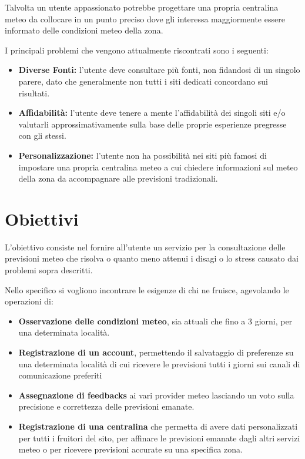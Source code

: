 \par Talvolta un utente appassionato potrebbe progettare una propria centralina meteo da collocare in un punto preciso dove gli interessa maggiormente essere informato delle condizioni meteo della zona.

\par I principali problemi che vengono attualmente riscontrati sono i seguenti:
\begin{itemize}

    \item \textbf{Diverse Fonti:} l'utente deve consultare più fonti, non fidandosi di un singolo parere, dato che generalmente non tutti i siti dedicati concordano sui risultati.
    
    \item \textbf{Affidabilità:} l'utente deve tenere a mente l'affidabilità dei singoli siti e/o valutarli approssimativamente sulla base delle proprie esperienze pregresse con gli stessi.
    
    \item \textbf{Personalizzazione:} l'utente non ha possibilità nei siti più famosi di impostare una propria centralina meteo a cui chiedere informazioni sul meteo della zona da accompagnare alle previsioni tradizionali.
    
\end{itemize}
 
\section{Obiettivi}
L'obiettivo consiste nel fornire all'utente un servizio per la consultazione delle previsioni meteo che risolva o quanto meno attenui i disagi o lo stress causato dai problemi sopra descritti. 

\par Nello specifico si vogliono incontrare le esigenze di chi ne fruisce, agevolando le operazioni di:
\begin{itemize}
    \item \textbf{Osservazione delle condizioni meteo}, sia attuali che fino a 3 giorni, per una determinata località.
    \item \textbf{Registrazione di un account}, permettendo il salvataggio di preferenze su una determinata località di cui ricevere le previsioni tutti i giorni sui canali di comunicazione preferiti
    \item \textbf{Assegnazione di feedbacks} ai vari provider meteo lasciando un voto sulla precisione e correttezza delle previsioni emanate. 
    \item \textbf{Registrazione di una centralina} che permetta di avere dati personalizzati per tutti i fruitori del sito, per affinare le previsioni emanate dagli altri servizi meteo o per ricevere previsioni accurate su una specifica zona.
\end{itemize}





